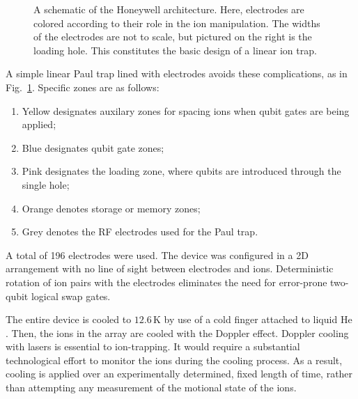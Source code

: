\documentclass[12pt,a4paper]{amsart}
\numberwithin{equation}{section}
\theoremstyle{plain}
\theoremstyle{definition}
\begin{document}
\begin{figure}
{}
    \caption{A schematic of the Honeywell architecture. Here, electrodes are colored according to their role in the ion manipulation. The widths of the electrodes are not to scale, but pictured on the right is the loading hole. This constitutes the basic design of a linear ion trap. \cite{honeywell}}
\label{fig:honeywell2}
\end{figure}


A simple linear Paul trap lined with electrodes avoids these complications, as in Fig.~\ref{fig:honeywell2}.
Specific zones are as follows:
\begin{enumerate}
\item
Yellow designates auxilary zones for spacing ions when qubit gates are being applied;
\item
Blue designates qubit gate zones;
\item
Pink designates the loading zone, where qubits are introduced through the single hole;
\item
Orange denotes storage or memory zones;
\item
Grey denotes the RF electrodes used for the Paul trap.
\end{enumerate}
A total of 196 electrodes were used. The device was configured in a 2D arrangement with no line of sight between electrodes and ions\cite{honeywell}\cite{quanCopyCat}. Deterministic rotation of ion pairs with the electrodes eliminates the need for error-prone two-qubit logical swap gates.


The entire device is cooled to $12.6\,$K by use of a cold finger attached to liquid He \cite{honeywell}. Then, the ions in the array are cooled with the Doppler effect. Doppler cooling with lasers is essential to ion-trapping. It would require a substantial technological effort to monitor the ions during the cooling process. As a result, cooling is applied over an experimentally determined, fixed length of time, rather than attempting any measurement of the motional state of the ions. 
\end{document}
